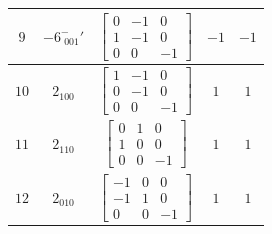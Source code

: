\documentclass[fleqn,8pt]{jsarticle}
\begin{document}
\begin{longtable}{ccccc}
$ 9 $ & $ -6^{-}_{\,\,001}{}' $ & $ \begin{bmatrix} 0 & -1 & 0 \\ 1 & -1 & 0 \\ 0 & 0 & -1 \end{bmatrix} $ & $ -1 $ & $ -1 $ \\ \hline
$ 10 $ & $ 2{}_{100} $ & $ \begin{bmatrix} 1 & -1 & 0 \\ 0 & -1 & 0 \\ 0 & 0 & -1 \end{bmatrix} $ & $ 1 $ & $ 1 $ \\ \hline
$ 11 $ & $ 2{}_{110} $ & $ \begin{bmatrix} 0 & 1 & 0 \\ 1 & 0 & 0 \\ 0 & 0 & -1 \end{bmatrix} $ & $ 1 $ & $ 1 $ \\ \hline
$ 12 $ & $ 2{}_{010} $ & $ \begin{bmatrix} -1 & 0 & 0 \\ -1 & 1 & 0 \\ 0 & 0 & -1 \end{bmatrix} $ & $ 1 $ & $ 1 $ \\
\end{longtable}
\end{document}
